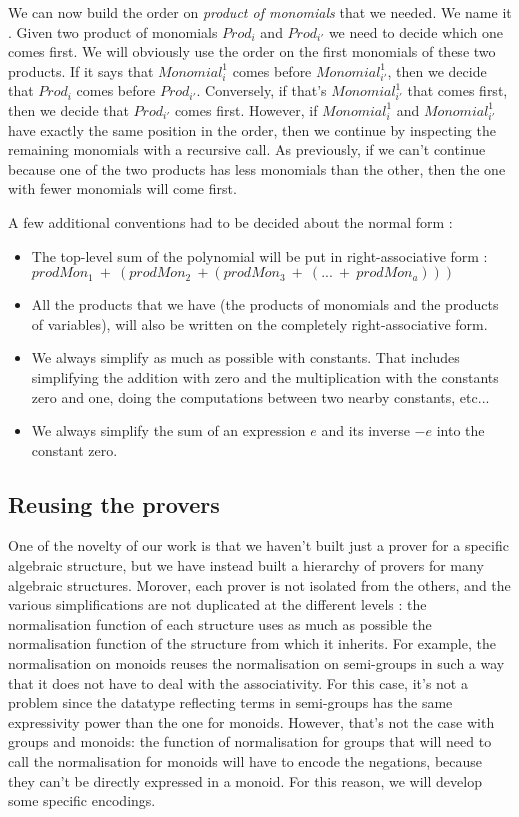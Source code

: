 We can now build the order on \emph{product of monomials} that we needed. We name it . Given two product of monomials $Prod_{i}$ and $Prod_{i'}$ we need to decide which one comes first. We will obviously use the order  on the first monomials of these two products. If it says that $Monomial_{i}^{1}$ comes before $Monomial_{i'}^{1}$, then we decide that $Prod_{i}$ comes before $Prod_{i'}$. Conversely, if that's $Monomial_{i'}^{1}$ that comes first, then we decide that $Prod_{i'}$ comes first. However, if $Monomial_{i}^{1}$ and $Monomial_{i'}^{1}$ have exactly the same position in the order, then we continue by inspecting the remaining monomials with a recursive call. As previously, if we can't continue because one of the two products has less monomials than the other, then the one with fewer monomials will come first.

A few additional conventions had to be decided about the normal form :
\begin{itemize}

\item The top-level sum of the polynomial will be put in right-associative form : \\
$prodMon_1\ +\ (prodMon_2\ + (prodMon_3\ +\ (...\ +\ prodMon_a)))$
\item All the products that we have (the products of monomials and the products of variables), will also be written on the completely right-associative form.
\item We always simplify as much as possible with constants. That includes simplifying the addition with zero and the multiplication with the constants zero and one, doing the computations between two nearby constants, etc...
\item We always simplify the sum of an expression $e$ and its inverse $-e$ into the constant zero. 

\end{itemize}

\subsection{Reusing the provers}
\label{sect:reusabilityOfTheProvers}

One of the novelty of our work is that we haven't built just a prover for a specific algebraic structure, but we have instead built a hierarchy of provers for many algebraic structures. Morover, each prover is not isolated from the others, and the various simplifications are not duplicated at the different levels : the normalisation function of each structure uses as much as possible the normalisation function of the structure from which it inherits. For example, the normalisation on monoids reuses the normalisation on semi-groups in such a way that it does not have to deal with the associativity. For this case, it's not a problem since the datatype reflecting terms in semi-groups has the same expressivity power than the one for monoids. However, that's not the case with groups and monoids: the function of normalisation for groups that will need to call the normalisation for monoids will have to encode the negations, because they can't be directly expressed in a monoid. For this reason, we will develop some specific encodings.

